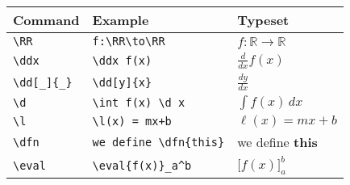 \documentclass{article}
\newcommand{\RR}{\mathbb R}
\renewcommand{\d}{\,d}
\newcommand{\dd}[2][]{\frac{d #1}{d #2}}
\renewcommand{\l}{\ell}
\newcommand{\ddx}{\frac{d}{dx}}
\newcommand{\dfn}{\textbf}
\newcommand{\eval}[1]{\bigg[ #1 \bigg]}
\begin{document}
\renewcommand{\arraystretch}{2}
\begin{tabular*}{1.0\textwidth}{lll}
\hline
Command & Example & Typeset \\
\hline
\verb|\RR| & \verb|f:\RR\to\RR| & $f:\RR\to\RR$\\ 
\verb|\ddx| & \verb|\ddx f(x)| & $\ddx f(x)$\\
\verb|\dd[_]{_}| & \verb|\dd[y]{x}| & $\dd[y]{x}$ \\
\verb|\d | & \verb|\int f(x) \d x| & $\int f(x) \d x$\\
\verb|\l| & \verb|\l(x) = mx+b| & $\l(x) = mx +b$\\
\verb|\dfn| & \verb|we define \dfn{this}| & we define \dfn{this}\\
\verb|\eval| & \verb|\eval{f(x)}_a^b| & $\eval{f(x)}_a^b$
\end{tabular*}
\end{document}
